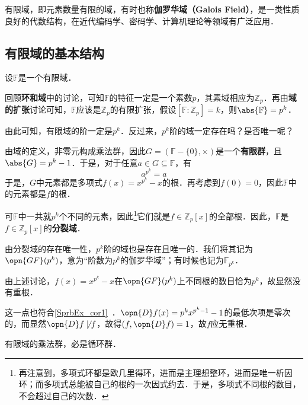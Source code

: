 

有限域，即元素数量有限的域，有时也称\textbf{伽罗华域（Galois Field）}，是一类性质良好的代数结构，在近代编码学、密码学、计算机理论等领域有广泛应用．

\subsection{有限域的基本结构}



设$\mathbb{F}$是一个有限域．

回顾\textbf{环和域}中的讨论，可知$\mathbb{F}$的特征一定是一个素数$p$，其素域相应为$\mathbb{Z}_p$．再由\textbf{域的扩张}讨论可知，$\mathbb{F}$应该是$\mathbb{Z}_p$的有限扩张，假设$[\mathbb{F}:\mathbb{Z}_p]=k$，则$\abs{\mathbb{F}}=p^k$．

由此可知，有限域的阶一定是$p^k$．反过来，$p^k$阶的域一定存在吗？是否唯一呢？

由域的定义，非零元构成乘法群，因此$G=(\mathbb{F}-\{0\}, \times)$是一个\textbf{有限群}，且$\abs{G}=p^k-1$．于是，对于任意$a\in G\subseteq\mathbb{F}$，有
\begin{equation}
a^{p^k}=a
\end{equation}
于是，$G$中元素都是多项式$f(x)=x^{p^k}-x$的根．再考虑到$f(0)=0$，因此$\mathbb{F}$中的元素都是$f$的根．

可$\mathbb{F}$中一共就$p^k$个不同的元素，因此\footnote{再注意到，多项式环都是欧几里得环，进而是主理想整环，进而是唯一析因环；而多项式总能被自己的根的一次因式约去．于是，多项式不同根的数目，不会超过自己的次数．}它们就是$f\in\mathbb{Z}_p[x]$的全部根．因此，$\mathbb{F}$是$f\in\mathbb{Z}_p[x]$的\textbf{分裂域}．

由分裂域的存在唯一性，$p^k$阶的域也是存在且唯一的．我们将其记为$\opn{GF}(p^k)$，意为“阶数为$p^k$的伽罗华域”；有时候也记为$\mathbb{F}_{p^k}$．

\begin{example}{}
由上述讨论，$f(x)=x^{p^k}-x$在$\opn{GF}(p^k)$上不同根的数目恰为$p^k$，故显然没有重根．

这一点也符合\autoref{SprbEx_cor1}~．$\opn{D}f(x)=p^kx^{p^k-1}-1$的最低次项是零次的，而显然$\opn{D}f\not\mid f$，故得$(f, \opn{D}f)=1$，故$f$应无重根．
\end{example}


\begin{theorem}{}\label{FntFld_the1}
有限域的乘法群，必是循环群．
\end{theorem}

